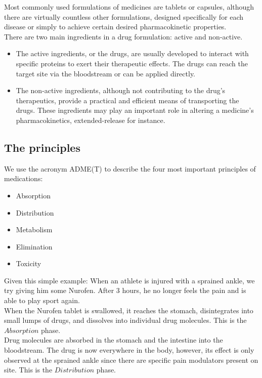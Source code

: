 \documentclass{report}
\begin{document}
		Most commonly used formulations of medicines are tablets or capsules, although there are virtually countless other formulations, designed specifically for each disease or simply to achieve certain desired pharmacokinetic properties. \\
		
		There are two main ingredients in a drug formulation: active and non-active.
		\begin{itemize}
			\item{The active ingredients, or the drugs, are usually developed to interact with specific proteins to exert their therapeutic effects. The drugs can reach the target site via the bloodstream or can be applied directly.}
			\item{The non-active ingredients, although not contributing to the drug's therapeutics, provide a practical and efficient means of transporting the drugs. These ingredients may play an important role in altering a medicine's pharmacokinetics, extended-release for instance.}
		\end{itemize}
		
	\subsection{The principles}
		We use the acronym ADME(T) to describe the four most important principles of medications:
		\begin{itemize}
			\item{Absorption}
			\item{Distribution}
			\item{Metabolism}
			\item{Elimination}
			\item{Toxicity}
		\end{itemize}
		
		Given this simple example: When an athlete is injured with a sprained ankle, we try giving him some Nurofen. After 3 hours, he no longer feels the pain and is able to play sport again. \\
		
		When the Nurofen tablet is swallowed, it reaches the stomach, disintegrates into small lumps of drugs, and dissolves into individual drug molecules. This is the $Absorption$ phase. \\
		
		Drug molecules are absorbed in the stomach and the intestine into the bloodstream. The drug is now everywhere in the body, however, its effect is only observed at the sprained ankle since there are specific pain modulators present on site. This is the $Distribution$ phase. \\
		
\end{document}
